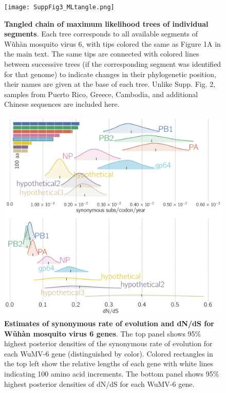 \documentclass[11pt,twocolumn]{article}
\begin{document}
\begin{figure}
\centering
\texttt{[image: SuppFig3\_MLtangle.png]}
\caption{
\textbf{Tangled chain of maximum likelihood trees of individual segments}.
Each tree corresponds to all available segments of W\v{u}h\`{a}n mosquito virus 6, with tips colored the same as Figure 1A in the main text.
The same tips are connected with colored lines between successive trees (if the corresponding segment was identified for that genome) to indicate changes in their phylogenetic position, their names are given at the base of each tree.
Unlike Supp. Fig. 2, samples from Puerto Rico, Greece, Cambodia, and additional Chinese sequences are included here.
}
\end{figure}


\begin{figure}
\centering
\includegraphics[width=\textwidth]{SuppFig4_synDNDS.png}
\caption{
\textbf{Estimates of synonymous rate of evolution and dN/dS for W\v{u}h\`{a}n mosquito virus 6 genes}.
The top panel shows 95\% highest posterior densities of the synonymous rate of evolution for each WuMV-6 gene (distinguished by color).
Colored rectangles in the top left show the relative lengths of each gene with white lines indicating 100 amino acid increments.
The bottom panel shows 95\% highest posterior densities of dN/dS for each WuMV-6 gene.
}
\end{figure}
\end{document}
